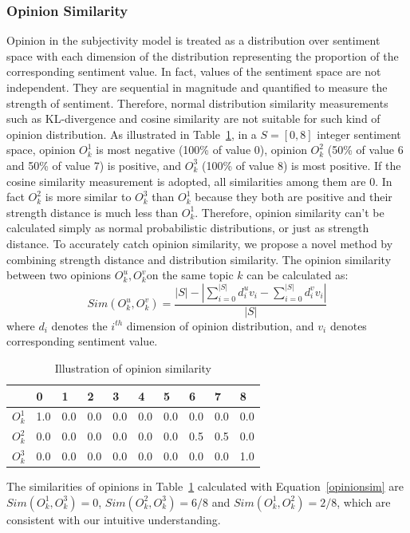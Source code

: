\documentclass[letterpaper]{article}
\begin{document}
\subsubsection{Opinion Similarity}
\label{opsim}

Opinion in the subjectivity model is treated  as a distribution over sentiment space with each dimension of the distribution representing the proportion of the corresponding sentiment value. 
In fact, values of the sentiment space are not independent. 
They are sequential in magnitude and quantified to measure the strength of sentiment. Therefore, normal distribution similarity measurements such as KL-divergence and cosine similarity are not suitable for such kind of opinion distribution. As illustrated in Table~\ref{tab1}, in a $ S=[0,8 ] $ integer sentiment space, opinion $ O_{k}^{1} $ is most negative (100\% of value 0), opinion $ O_{k}^{2} $ (50\% of value 6 and 50\% of value 7) is positive, and $ O_{k}^{3} $ (100\% of value 8) is most positive.
If the cosine similarity measurement is adopted, all similarities among them are 0.
In fact $ O_{k}^{2} $ is more similar to $ O_{k}^{3} $ than $O_{k}^{1} $ because they both are positive and their strength distance is much less than $ O_{k}^{1} $.  
Therefore, opinion similarity can't be calculated simply as normal probabilistic distributions, or just as strength distance. 
To accurately catch opinion similarity, we propose a novel method by combining strength distance and distribution similarity.
The opinion similarity between two opinions $O_{k}^{u},O_{k}^{v} $on the same topic $ k $ can be calculated as: 
\begin{equation}
\label{opinionsim}
Sim(O_{k}^{u},O_{k}^{v})=\dfrac{|S|-|\sum_{i=0}^{|S|}d_{i}^{u}v_{i}-\sum_{i=0}^{|S|}d_{i}^{v}v_{i}|}{|S|}
\end{equation}
where $ d_{i} $ denotes the $ i^{th} $ dimension of opinion distribution, and $ v_{i} $ denotes corresponding sentiment value. 
\begin{table}[htb]
\scriptsize
\centering
\caption{Illustration of opinion similarity}
\label{tab1}
\begin{tabular}{|l|l|l|l|l|l|l|l|l|l|}
\hline
 & 0 & 1& 2 & 3 & 4 & 5 & 6 & 7 & 8 \\
\hline
$O_{k}^{1}$ & 1.0 & 0.0 & 0.0 & 0.0 & 0.0 & 0.0 & 0.0 & 0.0 & 0.0 \\
\hline
$O_{k}^{2}$ & 0.0 & 0.0 & 0.0 & 0.0 & 0.0 & 0.0 & 0.5 & 0.5 & 0.0 \\
\hline
$O_{k}^{3}$ & 0.0 & 0.0 & 0.0 & 0.0 & 0.0 & 0.0 & 0.0 & 0.0 & 1.0 \\
\hline
\end{tabular}
\end{table} 
The similarities of opinions in Table~\ref{tab1} calculated with Equation~\ref{opinionsim} are $ Sim(O_{k}^{1},O_{k}^{3})=0 $, $ Sim(O_{k}^{2},O_{k}^{3})=6/8 $ and $ Sim(O_{k}^{1},O_{k}^{2})=2/8 $, which are consistent with our intuitive understanding. 
\end{document}
